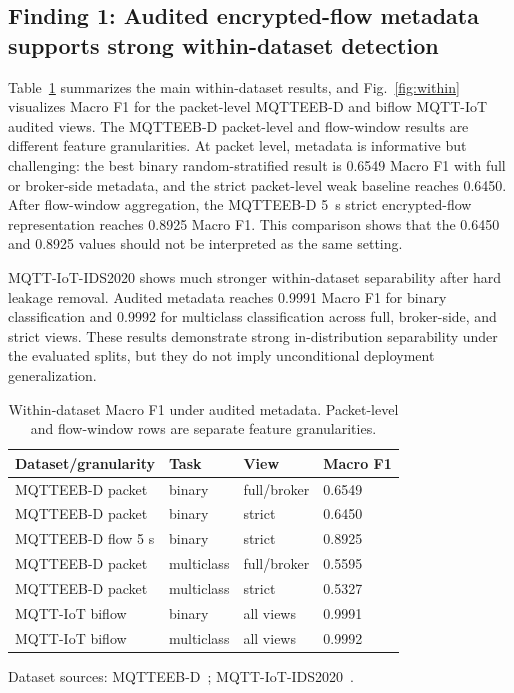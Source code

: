 \documentclass[lettersize,journal]{IEEEtran}
\begin{document}
\subsection{Finding 1: Audited encrypted-flow metadata supports strong within-dataset detection}
Table~\ref{tab:within} summarizes the main within-dataset results, and Fig.~\ref{fig:within} visualizes Macro F1 for the packet-level MQTTEEB-D and biflow MQTT-IoT audited views. The MQTTEEB-D packet-level and flow-window results are different feature granularities. At packet level, metadata is informative but challenging: the best binary random-stratified result is 0.6549 Macro F1 with full or broker-side metadata, and the strict packet-level weak baseline reaches 0.6450. After flow-window aggregation, the MQTTEEB-D 5~s strict encrypted-flow representation reaches 0.8925 Macro F1. This comparison shows that the 0.6450 and 0.8925 values should not be interpreted as the same setting.

MQTT-IoT-IDS2020 shows much stronger within-dataset separability after hard leakage removal. Audited metadata reaches 0.9991 Macro F1 for binary classification and 0.9992 for multiclass classification across full, broker-side, and strict views. These results demonstrate strong in-distribution separability under the evaluated splits, but they do not imply unconditional deployment generalization.

\begin{table}[!t]
\centering
\caption{Within-dataset Macro F1 under audited metadata. Packet-level and flow-window rows are separate feature granularities.}
\label{tab:within}
\begin{threeparttable}
\begin{tabular}{llll}
\toprule
Dataset/granularity & Task & View & Macro F1 \\
\midrule
MQTTEEB-D packet & binary & full/broker & 0.6549 \\
MQTTEEB-D packet & binary & strict & 0.6450 \\
MQTTEEB-D flow 5 s & binary & strict & 0.8925 \\
MQTTEEB-D packet & multiclass & full/broker & 0.5595 \\
MQTTEEB-D packet & multiclass & strict & 0.5327 \\
MQTT-IoT biflow & binary & all views & 0.9991 \\
MQTT-IoT biflow & multiclass & all views & 0.9992 \\
\bottomrule
\end{tabular}
\begin{tablenotes}[flushleft]
\footnotesize
\item Dataset sources: MQTTEEB-D~\cite{mqtteebd2025}; MQTT-IoT-IDS2020~\cite{hindy2020mqttiot}.
\end{tablenotes}
\end{threeparttable}
\end{table}
\end{document}
